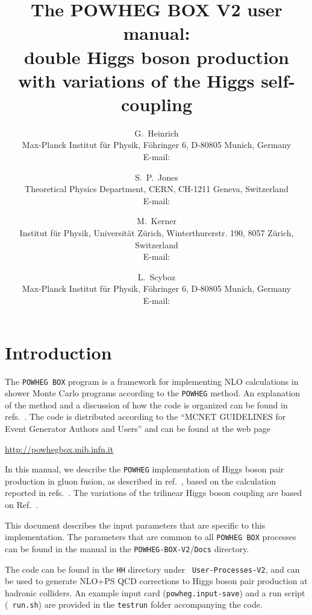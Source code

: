 \documentclass[paper]{JHEP3}
\title{The POWHEG BOX V2 user manual:\\
  double Higgs boson production with variations of the Higgs self-coupling} \vfill
\author{G.~Heinrich\\ 
  Max-Planck Institut f{\"u}r Physik, F\"ohringer 6, D-80805 Munich, Germany\\
  E-mail: \email{gudrun@mpp.mpg.de}
}
\author{S.~P.~Jones \\ 
Theoretical Physics Department, CERN, CH-1211 Geneva, Switzerland  \\
  E-mail: \email{s.jones@cern.ch}
}
\author{M.~Kerner \\ 
  Institut f{\"u}r Physik, Universit{\"a}t Z{\"u}rich, Winterthurerstr. 190, 8057 Z{\"u}rich, Switzerland\\
  E-mail: \email{kerner@mpp.mpg.de}
}
\author{L.~Scyboz\\
 Max-Planck Institut f{\"u}r Physik, F\"ohringer 6, D-80805 Munich, Germany\\ 
  E-mail: \email{scyboz@mpp.mpg.de}
}
\newcommand\POWHEG{{\tt POWHEG}}
\newcommand\POWHEGBOX{{\tt POWHEG BOX}}
\newcommand\POWHEGBOXV{{\tt POWHEG-BOX-V2}}
\begin{document}
\section{Introduction}

The \POWHEGBOX{} program is a framework for implementing NLO
calculations in shower Monte Carlo programs according to the \POWHEG{}
method. An explanation of the method and a discussion of how the code
is organized can be found in
refs.~\cite{Nason:2004rx,Frixione:2007vw,Alioli:2010xd,Jezo:2015aia}.
The code is distributed according to the ``MCNET GUIDELINES for Event
Generator Authors and Users'' and can be found at the web page
%
\begin{center}
 \url{http://powhegbox.mib.infn.it}
\end{center}
%
In this manual, we describe the \POWHEG{} implementation of Higgs
boson pair production in gluon fusion, as described in
ref.~\cite{Heinrich:2017kxx}, based on the calculation reported in
refs.~\cite{Borowka:2016ehy,Borowka:2016ypz}.  
The variations of the trilinear Higgs boson coupling are based on Ref.~\cite{Buchalla:2018yce}.


This document describes
the input parameters that are specific to this implementation. The
parameters that are common to all \POWHEGBOX{} processes can be found
in the manual in the \POWHEGBOXV{}/{\tt Docs} directory.

The code can be found in the {\tt HH} directory under {\tt
  User-Processes-V2}, and can be used to generate NLO+PS QCD
corrections to Higgs boson pair production at hadronic colliders. An
example input card ({\tt powheg.input-save}) and a run script ({\tt
  run.sh}) are provided in the {\tt testrun} folder accompanying the
code.
\end{document}
